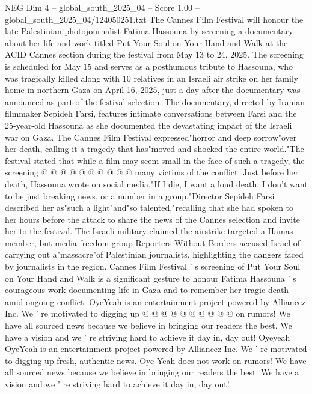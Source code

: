 \begin{textsample}{NEG Dim 4 – global\_south\_2025\_04 – Score 1.00 – global\_south\_2025\_04/124050251.txt}  \label{ex:f4_neg_238}
The Cannes Film Festival will honour the late Palestinian photojournalist Fatima Hassouna by screening a documentary about her life and work titled Put Your Soul on Your Hand and Walk at the ACID Cannes section during the festival from May 13 to 24, 2025.
The screening is scheduled for May 15 and serves as a posthumous tribute to Hassouna, who was tragically killed along with 10 relatives in an Israeli air strike on her family home in northern Gaza on April 16, 2025, just a day after the documentary was announced as part of the festival selection.
The documentary, directed by Iranian filmmaker Sepideh Farsi, features intimate conversations between Farsi and the 25-year-old Hassouna as she documented the devastating impact of the Israeli war on Gaza.
The Cannes Film Festival expressed"horror and deep sorrow"over her death, calling it a tragedy that has"moved and shocked the entire world."The festival stated that while a film may seem small in the face of such a tragedy, the screening @ @ @ @ @ @ @ @ @ @ many victims of the conflict.
Just before her death, Hassouna wrote on social media,"If I die, I want a loud death.
I don't want to be just breaking news, or a number in a group."Director Sepideh Farsi described her as"such a light"and"so talented,"recalling that she had spoken to her hours before the attack to share the news of the Cannes selection and invite her to the festival.
The Israeli military claimed the airstrike targeted a Hamas member, but media freedom group Reporters Without Borders accused Israel of carrying out a"massacre"of Palestinian journalists, highlighting the dangers faced by journalists in the region.
Cannes Film Festival ' s screening of Put Your Soul on Your Hand and Walk is a significant gesture to honour Fatima Hassouna ' s courageous work documenting life in Gaza and to remember her tragic death amid ongoing conflict.
OyeYeah is an entertainment project powered by Alliancez Inc.
We ' re motivated to digging up @ @ @ @ @ @ @ @ @ @ on rumors!
We have all sourced news because we believe in bringing our readers the best.
We have a vision and we ' re striving hard to achieve it day in, day out!
Oyeyeah OyeYeah is an entertainment project powered by Alliancez Inc.
We ' re motivated to digging up fresh, authentic news.
Oye Yeah does not work on rumors!
We have all sourced news because we believe in bringing our readers the best.
We have a vision and we ' re striving hard to achieve it day in, day out!

\end{textsample}
